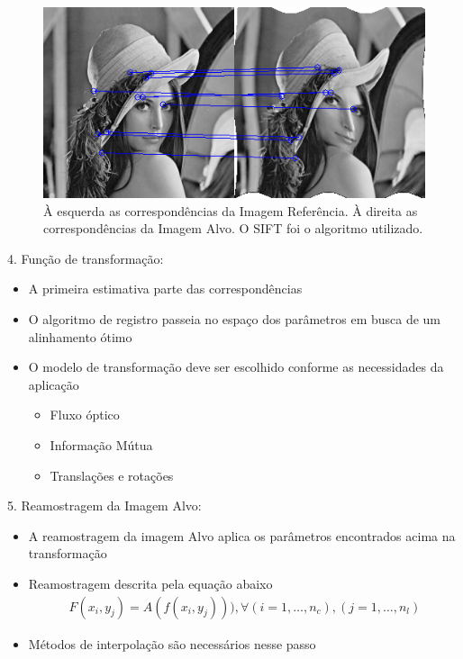 \documentclass[t]{beamer}
\begin{document}
\begin{frame}
  \begin{figure}[!h]
    \begin{center}
      \includegraphics[width=1.0\textwidth]{figuras/MatchedFeatures.png}
      \caption{À esquerda as correspondências da Imagem Referência. À direita as correspondências da Imagem Alvo. 
               O SIFT foi o algoritmo utilizado.}
    \end{center}
  \end{figure}
\end{frame}

\begin{frame}
  4. Função de transformação:
  \begin{itemize}
    \item A primeira estimativa parte das correspondências 
    \item O algoritmo de registro passeia no espaço dos parâmetros em busca de um alinhamento ótimo
    \item O modelo de transformação deve ser escolhido conforme as necessidades da aplicação
      \begin{itemize}
        \item Fluxo óptico
        \item Informação Mútua
        \item Translações e rotações
      \end{itemize}
  \end{itemize}
\end{frame}

\begin{frame}
  5. Reamostragem da Imagem Alvo:
  \begin{itemize}
    \item A reamostragem da imagem Alvo aplica os parâmetros encontrados acima na transformação
    \item Reamostragem descrita pela equação abaixo
  \begin{align}\label{eq:reamostragem}
    F(x_i,y_j) = A(f(x_i,y_j))), \forall (i = 1, \dots, n_c), (j = 1, \dots, n_l)
  \end{align}
    \item Métodos de interpolação são necessários nesse passo
  \end{itemize}
\end{frame}
\end{document}
